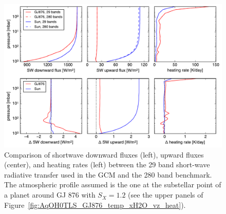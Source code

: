 \documentclass[11pt,numberedappendix,twocolappendix,]{emulateapj}
\begin{document}
\begin{figure}[!htb]
    \begin{center}
    \includegraphics[width=0.8\hsize]{rad_comparison_SW29-SW280_AqOH0TLS_GJ876S12P20L40Q.pdf}
    \end{center}
\caption{Comparison of shortwave downward fluxes (left), upward fluxes (center), and heating rates (left) between the 29 band short-wave radiative transfer used in the GCM and the 280 band benchmark. The atmospheric profile assumed is the one at the substellar point of a planet around GJ 876 with $S_X=1.2$ (see the upper panels of Figure~\ref{fig:AqOH0TLS_GJ876_temp_xH2O_vz_heat}). }
\label{fig:socrates}
\end{figure}
\end{document}
